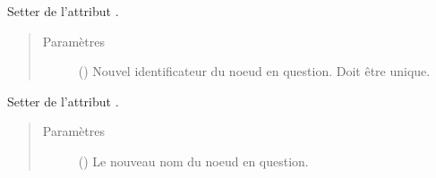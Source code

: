 \documentclass[letterpaper,10pt,french]{sphinxmanual}
\begin{document}
\begin{fulllineitems}
\begin{fulllineitems}
\begin{quote}
\begin{description}
\end{description}\end{quote}

\end{fulllineitems}


\begin{fulllineitems}
\label{\detokenize{index:StrategyTree.NodeST.set_id}}
Setter de l’attribut .
\begin{quote}\begin{description}
\item[{Paramètres}] \leavevmode
{} () \textendash{} Nouvel identificateur du noeud en question. Doit être unique.

\end{description}\end{quote}

\end{fulllineitems}


\begin{fulllineitems}
\label{\detokenize{index:StrategyTree.NodeST.set_name}}
Setter de l’attribut .
\begin{quote}\begin{description}
\item[{Paramètres}] \leavevmode
{} () \textendash{} Le nouveau nom du noeud en question.

\end{description}\end{quote}

\end{fulllineitems}


\end{fulllineitems}

\end{document}

